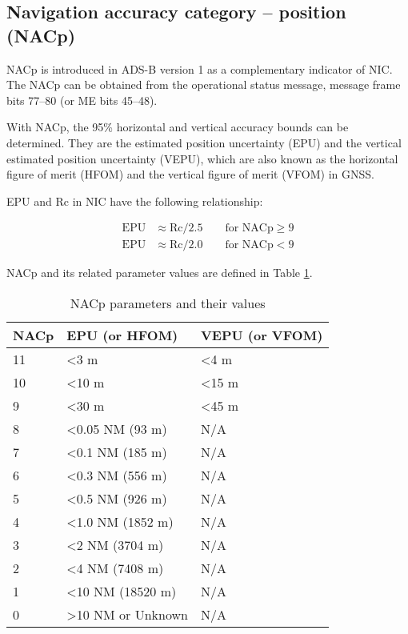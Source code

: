 \subsection{Navigation accuracy category -- position (NACp)}

NACp is introduced in ADS-B version 1 as a complementary indicator of NIC. The NACp can be obtained from the operational status message, message frame bits 77--80 (or ME bits 45--48).

With NACp, the 95\% horizontal and vertical accuracy bounds can be determined. They are the estimated position uncertainty (EPU) and the vertical estimated position uncertainty (VEPU), which are also known as the horizontal figure of merit (HFOM) and the vertical figure of merit (VFOM) in GNSS. 

EPU and Rc in NIC have the following relationship:

\begin{equation}
  \begin{split}
    \mathrm{EPU} &\approx \mathrm{Rc} / 2.5   \qquad  \text{for NACp} \ge 9 \\
    \mathrm{EPU} &\approx \mathrm{Rc} / 2.0  \qquad  \text{for NACp} < 9
  \end{split}
\end{equation}

NACp and its related parameter values are defined in Table \ref{tb:nacp-params}.

\begin{table}[]
\caption{NACp parameters and their values}
\label{tb:nacp-params}
\begin{tabular}{|l|l|l|}
\hline
\textbf{NACp} & \textbf{EPU (or HFOM)} & \textbf{VEPU (or VFOM)} \\ \hline \hline
11 & \textless 3 m & \textless 4 m \\ \hline
10 & \textless 10 m & \textless 15 m \\ \hline
9 & \textless 30 m & \textless 45 m \\ \hline
8 & \textless 0.05 NM (93 m) & N/A \\ \hline
7 & \textless 0.1 NM (185 m) & N/A \\ \hline
6 & \textless 0.3 NM (556 m) & N/A \\ \hline
5 & \textless 0.5 NM (926 m) & N/A \\ \hline
4 & \textless 1.0 NM (1852 m) & N/A \\ \hline
3 & \textless 2 NM (3704 m) & N/A \\ \hline
2 & \textless 4 NM (7408 m) & N/A \\ \hline
1 & \textless 10 NM (18520 m) & N/A \\ \hline
0 & \textgreater 10 NM or Unknown & N/A \\ \hline
\end{tabular}
\end{table}



